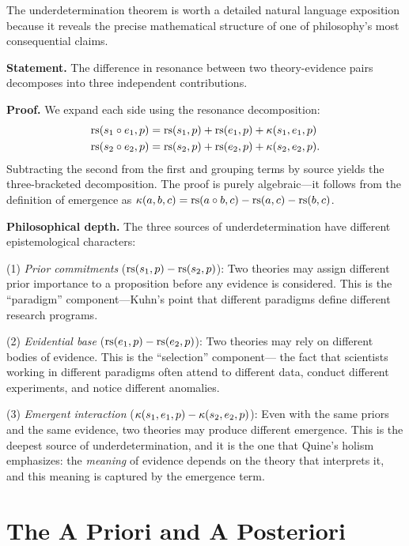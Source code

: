\begin{remark}
The underdetermination theorem is worth a detailed natural language exposition
because it reveals the precise mathematical structure of one of philosophy's
most consequential claims.

\textbf{Statement.} The difference in resonance between two theory-evidence
pairs decomposes into three independent contributions.

\textbf{Proof.} We expand each side using the resonance decomposition:
\begin{align*}
\mathrm{rs}(s_1 \circ e_1, p) &= \mathrm{rs}(s_1, p) + \mathrm{rs}(e_1, p) + \kappa(s_1, e_1, p) \\
\mathrm{rs}(s_2 \circ e_2, p) &= \mathrm{rs}(s_2, p) + \mathrm{rs}(e_2, p) + \kappa(s_2, e_2, p).
\end{align*}
Subtracting the second from the first and grouping terms by source yields the
three-bracketed decomposition. The proof is purely algebraic---it follows from
the definition of emergence as $\kappa(a, b, c) = \mathrm{rs}(a \circ b, c) -
\mathrm{rs}(a, c) - \mathrm{rs}(b, c)$.

\textbf{Philosophical depth.} The three sources of underdetermination have
different epistemological characters:

(1) \emph{Prior commitments} ($\mathrm{rs}(s_1, p) - \mathrm{rs}(s_2, p)$): Two theories may
assign different prior importance to a proposition before any evidence is
considered. This is the ``paradigm'' component---Kuhn's point that different
paradigms define different research programs.

(2) \emph{Evidential base} ($\mathrm{rs}(e_1, p) - \mathrm{rs}(e_2, p)$): Two theories may
rely on different bodies of evidence. This is the ``selection'' component---
the fact that scientists working in different paradigms often attend to different
data, conduct different experiments, and notice different anomalies.

(3) \emph{Emergent interaction} ($\kappa(s_1, e_1, p) - \kappa(s_2, e_2, p)$):
Even with the same priors and the same evidence, two theories may produce
different emergence. This is the deepest source of underdetermination, and it is
the one that Quine's holism emphasizes: the \emph{meaning} of evidence depends on
the theory that interprets it, and this meaning is captured by the emergence term.
\end{remark}

\section{The A Priori and A Posteriori}

